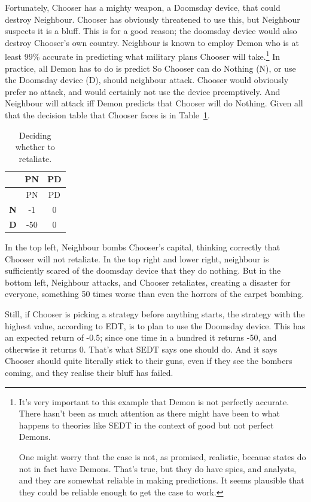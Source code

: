 \documentclass[
  12pt,
  letterpaper,
  DIV=11,
  numbers=noendperiod]{scrreprt}
\begin{document}
Fortunately, Chooser has a mighty weapon, a Doomsday device, that could
destroy Neighbour. Chooser has obviously threatened to use this, but
Neighbour suspects it is a bluff. This is for a good reason; the
doomsday device would also destroy Chooser's own country. Neighbour is
known to employ Demon who is at least 99\% accurate in predicting what
military plans Chooser will take.\footnote{It's very important to this
  example that Demon is not perfectly accurate. There hasn't been as
  much attention as there might have been to what happens to theories
  like SEDT in the context of good but not perfect Demons.

  One might worry that the case is not, as promised, realistic, because
  states do not in fact have Demons. That's true, but they do have
  spies, and analysts, and they are somewhat reliable in making
  predictions. It seems plausible that they could be reliable enough to
  get the case to work.} In practice, all Demon has to do is predict So
Chooser can do Nothing (N), or use the Doomsday device (D), should
neighbour attack. Chooser would obviously prefer no attack, and would
certainly not use the device preemptively. And Neighbour will attack iff
Demon predicts that Chooser will do Nothing. Given all that the decision
table that Chooser faces is in Table~\ref{tbl-retaliation}.

\hypertarget{tbl-retaliation}{}
\begin{longtable}[]{@{}ccc@{}}
\caption{\label{tbl-retaliation}Deciding whether to
retaliate.}\tabularnewline
\toprule\noalign{}
& PN & PD \\
\midrule\noalign{}
\endfirsthead
\toprule\noalign{}
& PN & PD \\
\midrule\noalign{}
\endhead
\bottomrule\noalign{}
\endlastfoot
\textbf{N} & -1 & 0 \\
\textbf{D} & -50 & 0 \\
\end{longtable}

In the top left, Neighbour bombs Chooser's capital, thinking correctly
that Chooser will not retaliate. In the top right and lower right,
neighbour is sufficiently scared of the doomsday device that they do
nothing. But in the bottom left, Neighbour attacks, and Chooser
retaliates, creating a disaster for everyone, something 50 times worse
than even the horrors of the carpet bombing.

Still, if Chooser is picking a strategy before anything starts, the
strategy with the highest value, according to EDT, is to plan to use the
Doomsday device. This has an expected return of -0.5; since one time in
a hundred it returns -50, and otherwise it returns 0. That's what SEDT
says one should do. And it says Chooser should quite literally stick to
their guns, even if they see the bombers coming, and they realise their
bluff has failed.
\end{document}
